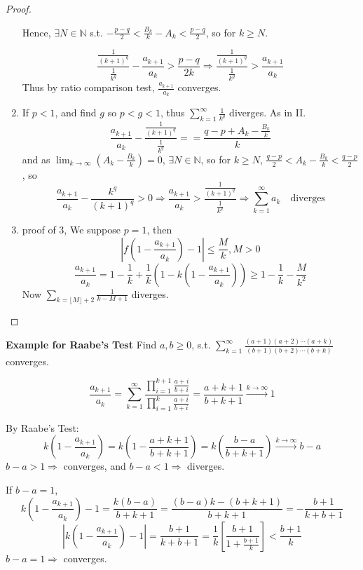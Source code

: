 \documentclass[12pt]{article}
\theoremstyle{plain}
\newcommand{\abs}[1]{\left| #1 \right|}
\newcommand{\floor}[1]{\lfloor #1 \rfloor}
\newcommand{\mN}{{\mathbb{N}}}
\begin{document}
\begin{proof}
\begin{enumerate}
	Hence, $\exists N \in \mN$ s.t. 
	$-\frac{p-q}2 < \frac{B_k}k - A_k < \frac{p-q}2$, so for $k\geq N$.

	\[
		\frac{\frac 1{(k+1)^q}}{\frac 1{k^q}} - \frac{a_{k+1}}{a_k}
		> \frac{p-q}{2k} \Rightarrow 
		\frac{\frac 1{(k+1)^q}}{\frac 1{k^q}} > \frac{a_{k+1}}{a_k}
	\]
	Thus by ratio comparison test, $\frac{a_{k+1}}{a_k}$ converges.

\item 
	If $p<1$, and find $g$ so $p < g < 1$, thus 
	$\sum_{k=1}^{\infty} \frac{1}{k^q}$ diverges. As in II. 
	\[
		\frac{a_{k+1}}{a_k} - \frac{\frac 1{(k+1)^q}}{\frac 1{k^q}} =
		 = \frac{q-p + A_k - \frac{B_k}k}{k}
	\]
	and as $\lim_{k\to\infty} (A_k - \frac{B_k}k) = 0$, $\exists N \in \mN$, 
	so for $k\geq N$, $\frac{q-p}2 < A_k - \frac{B_k}k < \frac{q-p}2$, so
	\[
		\frac{a_{k+1}}{a_k} - \frac{k^q}{(k+1)^q} > 0 \Rightarrow
		\frac{a_{k+1}}{a_k} > \frac{\frac1{(k+1)^q}}{\frac1{k^q}} 
		\Rightarrow \sum_{k=1}^{\infty} a_k 
		\quad \text{diverges}
	\]

\item 
	proof of $3$, We suppose $p = 1$, then 
	\[
		\abs{f(1-\frac{a_{k+1}}{a_k}) - 1} \leq \frac Mk, M >0	
	\]
	\[
		\frac{a_{k+1}}{a_k} = 1-\frac1k + \frac1k(1- k(1-\frac{a_{k+1}}{a_k}))
		\geq 1- \frac 1k - \frac{M}{k^2}
	\]
	Now $\sum_{k = \floor{M} + 2} \frac1{k-M+1}$ diverges. 
\end{enumerate}

\end{proof}

{\color{Brown}
\textbf{Example for Raabe's Test}
Find $a,b \geq 0$, s.t. 
$\sum_{k=1}^{\infty} \frac{(a+1)(a+2)\cdots(a+k)}{(b+1)(b+2)\cdots(b+k)}$ 
converges. 

\[
	\frac{a_{k+1}}{a_k} 
	= \sum_{k=1}^{\infty} 
	\frac{\prod_{i=1}^{k+1} \frac{a+i}{b+i}}{\prod_{i=1}^k \frac{a+i}{b+i}} 
	= \frac{a+k+1}{b+k+1} \overset{k\to\infty}{\longrightarrow} 1
\]

By Raabe's Test: 
\[
	k(1-\frac{a_{k+1}}{a_k}) = k(1-\frac{a+k+1}{b+k+1})
	= k(\frac{b-a}{b+k+1})
	\overset{k\to\infty}{\longrightarrow}
	b - a
\]
$b-a > 1 \Rightarrow$ converges, and $b-a < 1 \Rightarrow$ diverges.

If $b-a = 1$, 
\[
	k(1-\frac{a_{k+1}}{a_k})-1 = \frac{k(b-a)}{b+k+1} 
	= \frac{(b-a)k - (b+k+1)}{b+k+1}
	= -\frac{b+1}{k+b+1}
\]
\[
	\abs{k(1-\frac{a_{k+1}}{a_k})-1} 
	= \frac{b+1}{k+b+1} = \frac 1k [\frac{b+1}{1+\frac{b+1}k}]
	< \frac{b+1}k
\]
$b-a=1 \Rightarrow$ converges.
}	\\
\end{document}

